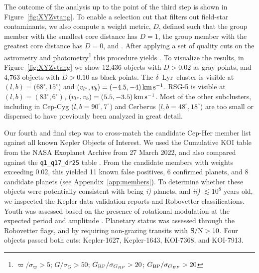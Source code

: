 \documentclass[12pt,twocolumn,tighten,linenumbers]{aastex63}
\newcommand{\mkms}{{\rm \,km\,s^{-1}}}  %
\begin{document}
The outcome of the analysis up to the point of the third step is shown
in Figure~\ref{fig:XYZvtang}.  To enable a selection cut that filters
out field-star contaminants, we also compute a weight metric,
$D$, defined such that the group member with the smallest core
distance has $D=1$, the group member with the greatest core
distance has $D=0$, and .  After applying a
set of quality cuts on the astrometry and
photometry\footnote{$\varpi/\sigma_\varpi>5$; $G/\sigma_{G}>50$;
$G_{\rm RP}/\sigma_{G_{RP}}>20$; $G_{\rm BP}/\sigma_{G_{BP}}>20$}
this procedure yields .
To visualize the results, in Figure~\ref{fig:XYZvtang} we show
12{,}436 objects with $D>0.02$ as gray points, and 
4{,}763 objects with $D>0.10$ as black points.   The
$\delta$~Lyr\ cluster is visible at $(l,b)=(68^\circ,15^\circ$) and $(v_{l^*},
v_b)=(-4.5 ,-4 )\mkms$.  RSG-5 is visible at $(l,b)=(83^\circ,6^\circ)$,
$(v_{l^*}, v_b)=(5.5 ,-3.5 )\mkms$.  Most of the other subclusters, including
in Cep-Cyg ($l,b=90^\circ,7^\circ$) and Cerberus ($l,b=48^\circ,18^\circ$) are
too small or dispersed to have previously been analyzed in great detail.

%
%
Our fourth and final step was to cross-match the candidate Cep-Her
member list against all known Kepler Objects of Interest.  We used the
Cumulative KOI table from the NASA Exoplanet Archive from 27 March
2022, and also compared against the \texttt{q1\_q17\_dr25} table
\citep{thompson_planetary_2018}.  From the candidate members with
weights exceeding 0.02, this yielded 11 known false positives, 6
confirmed planets, and 8 candidate planets (see Appendix~\ref{app:members}).
To determine whether these objects were
potentially consistent with being {\it i)} planets, and {\it ii)}
$\lesssim 10^8$ years old, we inspected the Kepler data validation
reports and Robovetter classifications.  Youth was assessed based on
the presence of rotational modulation at the expected period and
amplitude  \citep[{e.g.},][]{rebull_rotation_2020}. 
Planetary status was assessed through the Robovetter flags, and by
requiring non-grazing transits with ${\rm S/N}>10$.
Four objects passed both cuts: Kepler-1627, Kepler-1643, KOI-7368, and
KOI-7913.
\end{document}
